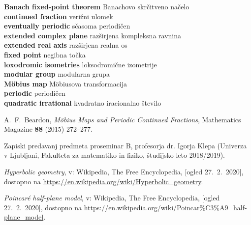 \documentclass[a4paper,12pt]{article}
\newcommand{\geslo}[2]{\noindent\textbf{#1} \quad \hangindent=1cm #2\\[-1pc]}
\begin{document}
\geslo{Banach fixed-point theorem}{Banachovo skrčitveno načelo}

\geslo{continued fraction}{verižni ulomek}

\geslo{eventually periodic}{sčasoma periodičen}

\geslo{extended complex plane}{razširjena kompleksna ravnina}

\geslo{extended real axis}{razširjena realna os}

\geslo{fixed point}{negibna točka}

\geslo{loxodromic isometries}{loksodromične izometrije}

\geslo{modular group}{modularna grupa}

\geslo{M\"obius map}{M\"obiusova transformacija}

\geslo{periodic}{periodičen}

\geslo{quadratic irrational}{kvadratno iracionalno število}



\begin{thebibliography}{1}

A.~F.~Beardon, \emph{M\"obius Maps and Periodic Continued Fractions}, Mathematics Magazine \textbf{88} (2015) 272--277.

Zapiski predavanj predmeta proseminar B, profesorja dr. Igorja Klepa (Univerza v Ljubljani, Fakulteta za matematiko in fiziko, študijsko leto 2018/2019).

\emph{Hyperbolic geometry}, v: Wikipedia, The Free Encyclopedia, [ogled 27.~2.~2020], dostopno na \url{https://en.wikipedia.org/wiki/Hyperbolic_geometry}.

\emph{Poincar\'e half-plane model}, v: Wikipedia, The Free Encyclopedia, [ogled 27.~2.~2020], dostopno na \url{https://en.wikipedia.org/wiki/Poincar%C3%A9_half-plane_model}.

\end{thebibliography}
\end{document}
